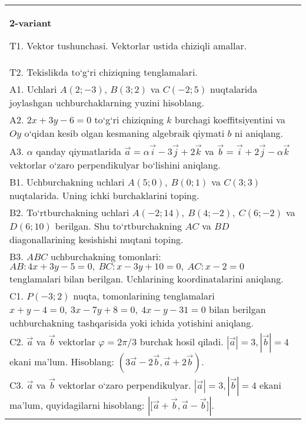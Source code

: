 \documentclass{article}
\begin{document}
\begin{tabular}{m{17cm}}
\textbf{2-variant}

T1. 
Vektor tushunchasi. Vektorlar ustida chiziqli amallar.
 \\
T2. 
Tekislikda to‘g‘ri chiziqning tenglamalari.
 \\
A1. 
Uchlari $A (2;-3) $, $B (3;2) $ va $C (-2;5) $
nuqtalarida joylashgan uchburchaklarning yuzini hisoblang.
 \\
A2. 
$2x+3y-6=0$ to‘g‘ri chiziqning $k$ burchagi
koeffitsiyentini va $Oy$ o‘qidan kesib olgan kesmaning algebraik
qiymati $b$ ni aniqlang.
 \\
A3. 
$\alpha$
qanday qiymatlarida 
$\overrightarrow{a} = \alpha\overrightarrow{i} - 3\overrightarrow{j} + 2\overrightarrow{k}$
va
$\overrightarrow{b} = \overrightarrow{i} + 2\overrightarrow{j} - \alpha\overrightarrow{k}$
vektorlar o‘zaro perpendikulyar bo‘lishini aniqlang.
 \\
B1. 
Uchburchakning uchlari \(A (5;0),\ B (0;1) \) va \(C (3;3) \)
nuqtalarida. Uning ichki burchaklarini toping.
 \\
B2. 
To‘rtburchakning uchlari
\(A (-2;14),\ B (4;-2),\ C (6;-2) \) va \(D (6;10) \) berilgan. Shu
to‘rtburchakning $AC$ va $BD$ diagonallarining kesishishi
nuqtani toping.
 \\
B3. 
$ABC$ uchburchakning tomonlari:
\(AB:4x+3y-5=0,\ BC:x-3y+10=0,\ AC:x-2=0\) 
tenglamalari bilan berilgan. Uchlarining koordinatalarini aniqlang.
 \\
C1. 
\(P (-3;2) \) nuqta, tomonlarining tenglamalari
\(x+y-4=0,\ 3x-7y+8=0,\ 4x-y-31=0\) bilan
berilgan uchburchakning tashqarisida yoki ichida yotishini aniqlang.
 \\
C2. 
$\vec{a}$ va $\vec{b}$ vektorlar $\varphi = 2\pi/3$ burchak hosil qiladi. $|\vec{a}| = 3,|\vec{b}| = 4$ ekani ma’lum. Hisoblang:
$\left(3\vec{a} - 2\vec{b},\vec{a} + 2\vec{b} \right) $.
 \\
C3. 
$\vec{a}$ va $\vec{b}$ vektorlar o‘zaro perpendikulyar. $|\vec{a}| = 3,|\vec{b}| = 4$ ekani ma’lum, quyidagilarni hisoblang:
$|\lbrack\vec{a} + \vec{b},\vec{a} - \vec{b}\rbrack|$.
 \\

\end{tabular}
\vspace{1cm}
\end{document}
